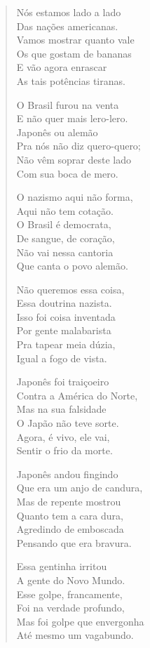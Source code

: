 \begin{verse}
Nós estamos lado a lado\\
Das nações americanas.\\
Vamos mostrar quanto vale\\
Os que gostam de bananas\\
E vão agora enrascar\\
As tais potências tiranas.
\pagebreak

O Brasil furou na venta\\
E não quer mais lero-lero.\\
Japonês ou alemão\\
Pra nós não diz quero-quero;\\
Não vêm soprar deste lado\\
Com sua boca de mero.

O nazismo aqui não forma,\\
Aqui não tem cotação.\\
O Brasil é democrata, \\
De sangue, de coração,\\
Não vai nessa cantoria\\
Que canta o povo alemão.

Não queremos essa coisa,\\
Essa doutrina nazista.\\
Isso foi coisa inventada\\
Por gente malabarista\\
Pra tapear meia dúzia,\\
Igual a fogo de vista.

Japonês foi traiçoeiro\\
Contra a América do Norte,\\
Mas na sua falsidade\\
O Japão não teve sorte.\\
Agora, é vivo, ele vai,\\
Sentir o frio da morte.
\pagebreak

Japonês andou fingindo\\
Que era um anjo de candura,\\
Mas de repente mostrou\\
Quanto tem a cara dura,\\
Agredindo de emboscada\\
Pensando que era bravura.

Essa gentinha irritou\\
A gente do Novo Mundo.\\
Esse golpe, francamente,\\
Foi na verdade profundo,\\
Mas foi golpe que envergonha\\
Até mesmo um vagabundo.


\end{verse}
